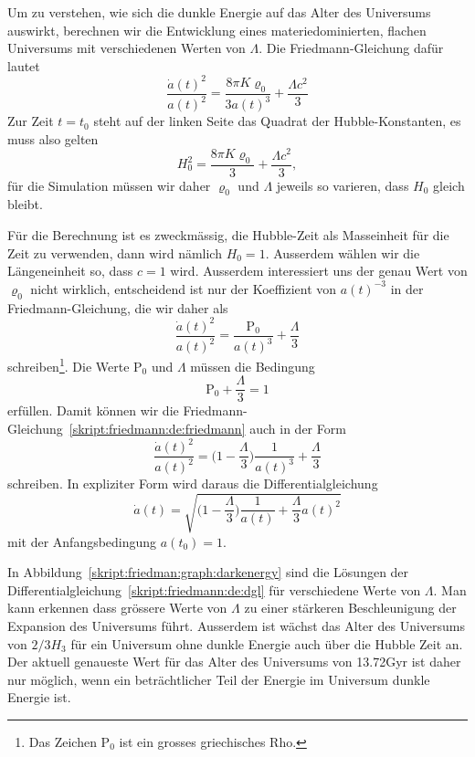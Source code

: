 Um zu verstehen, wie sich die dunkle Energie auf das Alter des Universums
auswirkt, berechnen wir die Entwicklung eines materiedominierten, flachen 
Universums mit verschiedenen Werten von $\Lambda$.
Die Friedmann-Gleichung dafür lautet
\[
\frac{\dot a(t)^2}{a(t)^2}
=
\frac{8\pi K \varrho_0}{3a(t)^3} + \frac{\Lambda c^2}{3}
\]
Zur Zeit $t=t_0$ steht auf der linken Seite das Quadrat der Hubble-Konstanten,
es muss also gelten
\[
H_0^2
=
\frac{8\pi K \varrho_0}{3} + \frac{\Lambda c^2}{3},
\]
für die Simulation müssen wir daher $\varrho_0$ und $\Lambda$ jeweils
so varieren, dass $H_0$ gleich bleibt.

Für die Berechnung ist es zweckmässig, die Hubble-Zeit als Masseinheit
für die Zeit zu verwenden, dann wird nämlich $H_0=1$.
Ausserdem wählen wir die Längeneinheit so, dass $c=1$ wird.
Ausserdem interessiert uns der genau Wert von $\varrho_0$ nicht wirklich,
entscheidend ist nur der Koeffizient von $a(t)^{-3}$ in der
Friedmann-Gleichung, die wir daher als
\newcommand{\Rho}{\mathrm{P}}
\begin{equation}
\frac{\dot a(t)^2}{a(t)^2}
=
\frac{\Rho_0}{a(t)^3} + \frac{\Lambda}{3}
\label{skript:friedmann:de:friedmann}
\end{equation}
schreiben\footnote{Das Zeichen $\Rho_0$ ist ein grosses griechisches Rho.}.
Die Werte $\Rho_0$ und $\Lambda$ müssen die Bedingung
\begin{equation}
\Rho_0 + \frac{\Lambda}{3}=1
\end{equation}
erfüllen.
Damit können wir die Friedmann-Gleichung~\eqref{skript:friedmann:de:friedmann}
auch in der Form
\begin{equation}
\frac{\dot a(t)^2}{a(t)^2}
=
\biggl(1-\frac{\Lambda}3\biggr)\frac1{a(t)^3} + \frac{\Lambda}3
\label{skript:friedmann:de:simulation}
\end{equation}
schreiben.
In expliziter Form wird daraus die Differentialgleichung
\begin{equation}
\dot a(t)
=
\sqrt{
\biggl(1-\frac{\Lambda}3\biggr)\frac1{a(t)} + \frac{\Lambda}3 a(t)^2
}
\label{skript:friedmann:de:dgl}
\end{equation}
mit der Anfangsbedingung $a(t_0)=1$.

In Abbildung~\ref{skript:friedman:graph:darkenergy} sind die Lösungen
der Differentialgleichung~\eqref{skript:friedmann:de:dgl} für verschiedene
Werte von $\Lambda$.
Man kann erkennen dass grössere Werte von $\Lambda$ zu einer stärkeren
Beschleunigung der Expansion des Universums führt.
Ausserdem ist wächst das Alter des Universums von $2/3H_3$ für ein
Universum ohne dunkle Energie auch über die Hubble Zeit an.
Der aktuell genaueste Wert für das Alter des Universums von 13.72Gyr
ist daher nur möglich, wenn ein beträchtlicher Teil der Energie im
Universum dunkle Energie ist.

